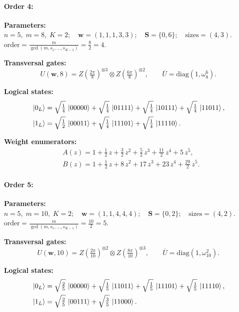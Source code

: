 \documentclass[pdflatex,sn-nature]{sn-jnl}%
\theoremstyle{thmstyleone}%
\theoremstyle{thmstyletwo}%
\theoremstyle{thmstylethree}%
\begin{document}
\begin{appendices}
\paragraph{\textbf{Order 4:}}
\noindent\textbf{Parameters:} $n=5,\; m=8,\; K=2;\quad \mathbf w=(1, 1, 1, 3, 3);\quad \mathbf S=\{0, 6\};\quad \text{sizes}=\left(4, 3\right).$ $\displaystyle \text{order}=\frac{m}{\gcd(m,s_1,\dots,s_{K-1})}=\frac{8}{2}=4.$

\noindent\textbf{Transversal gates:}
\[
    U(\mathbf w,8)=Z \left(\tfrac{2\pi}{8}\right)^{\otimes3} \otimes Z \left(\tfrac{6\pi}{8}\right)^{\otimes2},\qquad
    \overline U=\mathrm{diag}(1,\omega_8^{6}).
\]

\noindent\textbf{Logical states:}
\begin{align*}
    &\ket{0_L} = \sqrt{\tfrac{1}{4}}\,\ket{00000} + \sqrt{\tfrac{1}{4}}\,\ket{01111} + \sqrt{\tfrac{1}{4}}\,\ket{10111} + \sqrt{\tfrac{1}{4}}\,\ket{11011}, \\
    &\ket{1_L} = \sqrt{\tfrac{1}{2}}\,\ket{00011} + \sqrt{\tfrac{1}{4}}\,\ket{11101} + \sqrt{\tfrac{1}{4}}\,\ket{11110}.
\end{align*}

\noindent\textbf{Weight enumerators:}
\begin{align*}
    &A(z) = 1 + \tfrac{1}{2}\,z + \tfrac{3}{2}\,z^{2} + \tfrac{5}{2}\,z^{3} + \tfrac{11}{2}\,z^{4} + 5\,z^{5}, \\
    &B(z) = 1 + \tfrac{1}{2}\,z + 8\,z^{2} + 17\,z^{3} + 23\,z^{4} + \tfrac{29}{2}\,z^{5}.
\end{align*}

\paragraph{\textbf{Order 5:}}
\noindent\textbf{Parameters:} $n=5,\; m=10,\; K=2;\quad \mathbf w=(1, 1, 4, 4, 4);\quad \mathbf S=\{0, 2\};\quad \text{sizes}=\left(4, 2\right).$ $\displaystyle \text{order}=\frac{m}{\gcd(m,s_1,\dots,s_{K-1})}=\frac{10}{2}=5.$

\noindent\textbf{Transversal gates:}
\[
    U(\mathbf w,10)=Z \left(\tfrac{2\pi}{10}\right)^{\otimes2} \otimes Z \left(\tfrac{8\pi}{10}\right)^{\otimes3},\qquad
    \overline U=\mathrm{diag}(1,\omega_{10}^{2}).
\]

\noindent\textbf{Logical states:}
\begin{align*}
    &\ket{0_L} = \sqrt{\tfrac{2}{5}}\,\ket{00000} + \sqrt{\tfrac{1}{5}}\,\ket{11011} + \sqrt{\tfrac{1}{5}}\,\ket{11101} + \sqrt{\tfrac{1}{5}}\,\ket{11110}, \\
    &\ket{1_L} = \sqrt{\tfrac{2}{5}}\,\ket{00111} + \sqrt{\tfrac{3}{5}}\,\ket{11000}.
\end{align*}


\end{appendices}
\end{document}
